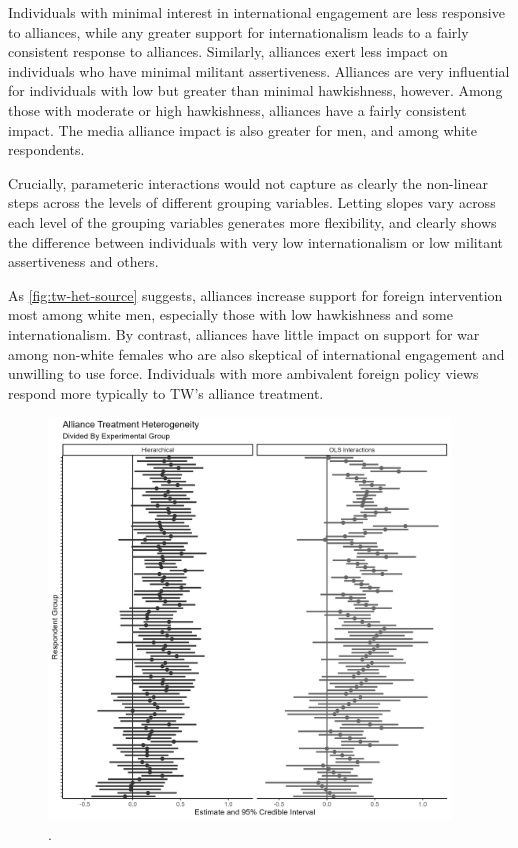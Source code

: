 \documentclass[12pt]{article}
\begin{document}
Individuals with minimal interest in international engagement are less responsive to alliances, while any greater support for internationalism leads to a fairly consistent response to alliances. 
Similarly, alliances exert less impact on individuals who have minimal militant assertiveness. 
Alliances are very influential for individuals with low but greater than minimal hawkishness, however. 
Among those with moderate or high hawkishness, alliances have a fairly consistent impact. 
The media alliance impact is also greater for men, and among white respondents. 


Crucially, parameteric interactions would not capture as clearly the non-linear steps across the levels of different grouping variables. 
Letting slopes vary across each level of the grouping variables generates more flexibility, and clearly shows the difference between individuals with very low internationalism or low militant assertiveness and others. 


As \autoref{fig:tw-het-source} suggests, alliances increase support for foreign intervention most among white men, especially those with low hawkishness and some internationalism.
By contrast, alliances have little impact on support for war among non-white females who are also skeptical of international engagement and unwilling to use force.
Individuals with more ambivalent foreign policy views respond more typically to TW's alliance treatment. 




\begin{figure}[htpb]
	\centering
		\includegraphics[width=0.95\textwidth]{../figures/tw-treat-het-comp.png}
	\caption{.}
	\label{fig:tw-treat-het-comp}
\end{figure}
\end{document}
